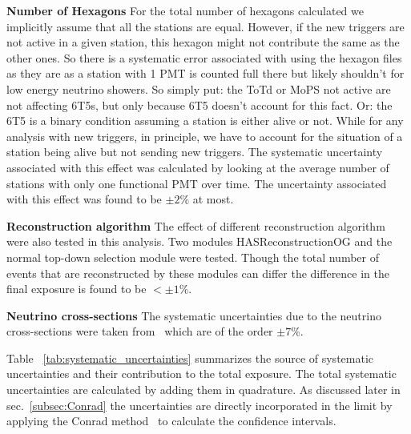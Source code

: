 \begin{description}
  \item \textbf{Number of Hexagons} For the total number of hexagons calculated we implicitly assume that all the stations are equal. However, if the new triggers are not active in a given station, this hexagon might not contribute the same as the other ones. So there is a systematic error associated with using the hexagon files as they are as a station with 1 PMT is counted full there but likely shouldn't for low energy neutrino showers. So simply put: the ToTd or MoPS not active are not affecting 6T5s, but only because 6T5 doesn't account for this fact. Or: the 6T5 is a binary condition assuming a station is either alive or not. While for any analysis with new triggers, in principle, we have to account for the situation of a station being alive but not sending new triggers. The systematic uncertainty associated with this effect was calculated by looking at the average number of stations with only one functional PMT over time. The uncertainty associated with this effect was found to be $\pm 2\%$ at most. 
  \item \textbf{Reconstruction algorithm} The effect of different reconstruction algorithm were also tested in this analysis. Two modules HASReconstructionOG and the normal top-down selection module were tested. Though the total number of events that are reconstructed by these modules can differ the difference in the final exposure is found to be $< \pm 1\%$. 
  \item \textbf{Neutrino cross-sections} The systematic uncertainties due to the neutrino cross-sections were taken from~\cite{Cooper-Sarkar:2011jtt} which are of the order $\pm 7\%$.
\end{description}

Table ~\ref{tab:systematic_uncertainties} summarizes the  source of systematic uncertainties and their contribution to the total exposure. The total systematic uncertainties are calculated by adding them in quadrature. As discussed later in sec.~\ref{subsec:Conrad} the uncertainties are directly incorporated in the limit by applying the Conrad method~\cite{Conrad:2002kn} to calculate the confidence intervals. 

